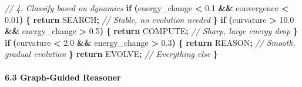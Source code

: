 \documentclass[
  11pt,
  a4paper,
]{article}
\newenvironment{Shaded}{\begin{snugshade}}{\end{snugshade}}
\newcommand{\CommentTok}[1]{\textcolor[rgb]{0.56,0.35,0.01}{\textit{#1}}}
\newcommand{\ControlFlowTok}[1]{\textcolor[rgb]{0.13,0.29,0.53}{\textbf{#1}}}
\newcommand{\FloatTok}[1]{\textcolor[rgb]{0.00,0.00,0.81}{#1}}
\newcommand{\NormalTok}[1]{#1}
\newcommand{\OperatorTok}[1]{\textcolor[rgb]{0.81,0.36,0.00}{\textbf{#1}}}
\begin{document}
\begin{Shaded}
\begin{Highlighting}[]
    \CommentTok{// 4. Classify based on dynamics}
    \ControlFlowTok{if} \OperatorTok{(}\NormalTok{energy\_change }\OperatorTok{\textless{}} \FloatTok{0.1} \OperatorTok{\&\&}\NormalTok{ convergence }\OperatorTok{\textless{}} \FloatTok{0.01}\OperatorTok{)} \OperatorTok{\{}
        \ControlFlowTok{return}\NormalTok{ SEARCH}\OperatorTok{;}  \CommentTok{// Stable, no evolution needed}
    \OperatorTok{\}}
    \ControlFlowTok{if} \OperatorTok{(}\NormalTok{curvature }\OperatorTok{\textgreater{}} \FloatTok{10.0} \OperatorTok{\&\&}\NormalTok{ energy\_change }\OperatorTok{\textgreater{}} \FloatTok{0.5}\OperatorTok{)} \OperatorTok{\{}
        \ControlFlowTok{return}\NormalTok{ COMPUTE}\OperatorTok{;}  \CommentTok{// Sharp, large energy drop}
    \OperatorTok{\}}
    \ControlFlowTok{if} \OperatorTok{(}\NormalTok{curvature }\OperatorTok{\textless{}} \FloatTok{2.0} \OperatorTok{\&\&}\NormalTok{ energy\_change }\OperatorTok{\textgreater{}} \FloatTok{0.3}\OperatorTok{)} \OperatorTok{\{}
        \ControlFlowTok{return}\NormalTok{ REASON}\OperatorTok{;}   \CommentTok{// Smooth, gradual evolution}
    \OperatorTok{\}}
    \ControlFlowTok{return}\NormalTok{ EVOLVE}\OperatorTok{;}       \CommentTok{// Everything else}
\OperatorTok{\}}
\end{Highlighting}
\end{Shaded}

\paragraph{6.3 Graph-Guided Reasoner}\label{graph-guided-reasoner}
\end{document}
